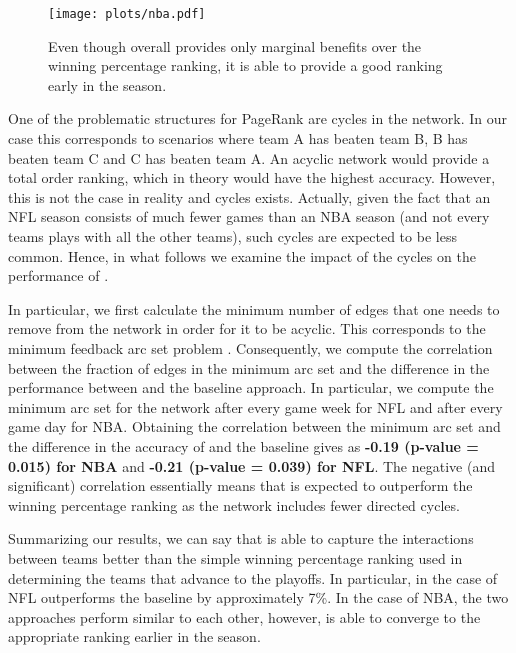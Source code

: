 \begin{figure}[t]
\begin{center}
\texttt{[image: plots/nba.pdf]}%
 \caption{Even though overall {\method} provides only marginal benefits over the winning percentage ranking, it is able to provide a good ranking early in the season.}
 \label{fig:nba}
\end{center}
\vspace{-0.2in}
\end{figure}

One of the problematic structures for PageRank are cycles in the network.  
In our case this corresponds to scenarios where team A has beaten team B, B has beaten team C and C has beaten team A. 
An acyclic network would provide a total order ranking, which in theory would have the highest accuracy.  
However, this is not the case in reality and cycles exists.  
Actually, given the fact that an NFL season consists of much fewer games than an NBA season (and not every teams plays with all the other teams), such cycles are expected to be less common.  
Hence, in what follows we examine the impact of the cycles on the performance of {\method}.  

In particular, we first calculate the minimum number of edges that one needs to remove from the network in order for it to be acyclic.  
This corresponds to the minimum feedback arc set problem \cite{eades1993fast}.  
Consequently, we compute the correlation between the fraction of edges in the minimum arc set and the difference in the performance between {\method} and the baseline approach.  
In particular, we compute the minimum arc set for the network after every game week for NFL and after every game day for NBA.  
Obtaining the correlation between the minimum arc set and the difference in the accuracy of {\method} and the baseline gives as {\bf -0.19 (p-value = 0.015) for NBA} and {\bf -0.21 (p-value = 0.039) for NFL}.  
The negative (and significant) correlation essentially means that {\method} is expected to outperform the winning percentage ranking as the network includes fewer directed cycles.  

Summarizing our results, we can say that {\method} is able to capture the interactions between teams better than the simple winning percentage ranking used in determining the teams that advance to the playoffs. 
In particular, in the case of NFL {\method} outperforms the baseline by approximately 7\%.  
In the case of NBA, the two approaches perform similar to each other, however, {\method} is able to converge to the appropriate ranking earlier in the season.  


